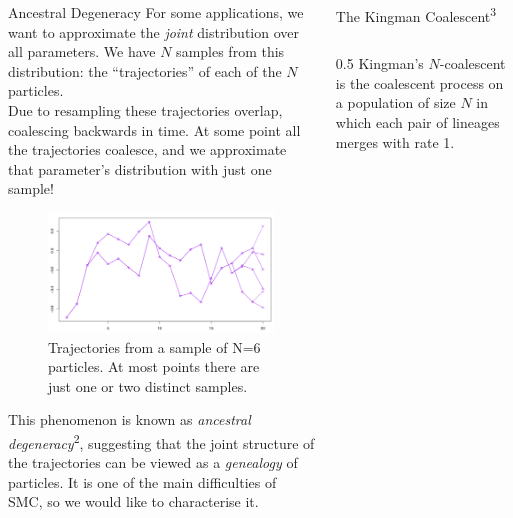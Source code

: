 \documentclass[final, 12pt]{beamer}
\newlength{\colwidth}
\begin{document}
\begin{frame}
\begin{columns}
\begin{column}{\colwidth}
\begin{block}{Ancestral Degeneracy}
For some applications, we want to approximate the \emph{joint} distribution over all parameters.
We have $N$ samples from this distribution: the ``trajectories'' of each of the $N$ particles.\\[12pt]

Due to resampling these trajectories overlap, coalescing backwards in time. At some point all the trajectories coalesce, and we approximate that parameter's distribution with just one sample!

\begin{figure} %
\includegraphics[width=0.9\colwidth]{../degeneracy.pdf}
\caption{Trajectories from a sample of N=6 particles. At most points there are just one or two distinct samples.}
\end{figure}

This phenomenon is known as \emph{ancestral degeneracy}\textsuperscript{2}, suggesting that the joint structure of the trajectories can be viewed as a \emph{genealogy} of particles. It is one of the main difficulties of SMC, so we would like to characterise it.
\end{block}
\end{column}

\begin{column}{\colwidth}

\begin{block}{The Kingman Coalescent\textsuperscript{3}}
\begin{columns}
\begin{column}{0.5\colwidth}
Kingman's $N$-coalescent is the coalescent process on a population of size $N$ in which each pair of lineages merges with rate 1.\\[12pt]


\end{column}
\end{columns}
\end{block}
\end{column}
\end{columns}
\end{frame}
\end{document}
